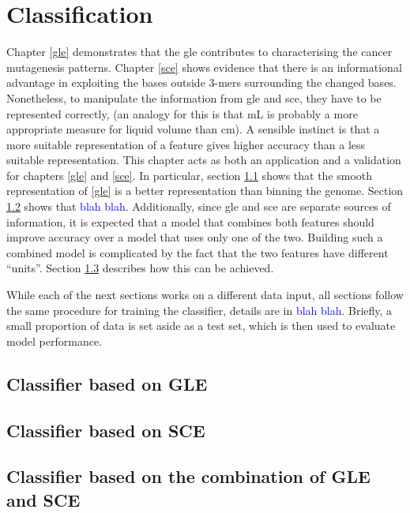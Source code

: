 \chapter{Classification}\label{ml}

Chapter \ref{gle} demonstrates that the \gls{gle} contributes to characterising the cancer mutagenesis patterns. Chapter \ref{sce} shows evidence that there is an informational advantage in exploiting the bases outside 3-mers surrounding the changed bases. Nonetheless, to manipulate the information from \gls{gle} and \gls{sce}, they have to be represented correctly, (an analogy for this is that mL is probably a more appropriate measure for liquid volume than cm). A sensible instinct is that a more suitable representation of a feature gives higher accuracy than a less suitable representation. This chapter acts as both an application and a validation for chapters \ref{gle} and \ref{sce}. In particular, section \ref{ml-gle} shows that the smooth representation of \ref{gle} is a better representation than binning the genome. Section \ref{ml-sce} shows that \textcolor{blue}{blah blah}. Additionally, since \gls{gle} and \gls{sce} are separate sources of information, it is expected that a model that combines both features should improve accuracy over a model that uses only one of the two. Building such a combined model is complicated by the fact that the two features have different ``units''. Section \ref{ml-both} describes how this can be achieved.

While each of the next sections works on a different data input, all sections follow the same procedure for training the classifier, details are in \textcolor{blue}{blah blah}. Briefly, a small proportion of data is set aside as a test set, which is then used to evaluate model performance.

\section{Classifier based on GLE}\label{ml-gle}
\section{Classifier based on SCE}\label{ml-sce}
\section{Classifier based on the combination of GLE and SCE}\label{ml-both}